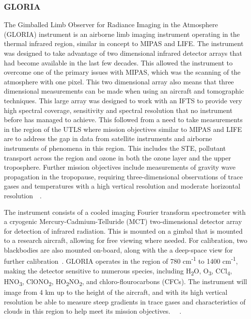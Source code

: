\subsubsection{GLORIA}
The Gimballed Limb Observer for Radiance Imaging in the Atmosphere (GLORIA) instrument is an airborne limb imaging instrument operating in the thermal infrared region, similar in concept to MIPAS and LIFE. The instrument was designed to take advantage of two dimensional infrared detector arrays that had become available in the last few decades. This allowed the instrument to overcome one of the primary issues with MIPAS, which was the scanning of the atmosphere with one pixel. This two dimensional array also means that three dimensional measurements can be made when using an aircraft and tomographic techniques. This large array was designed to work with an IFTS to provide very high spectral coverage, sensitivity and spectral resolution that no instrument before has managed to achieve. This followed from a need to take measurements in the region of the UTLS where mission objectives similar to MIPAS and LIFE are to address the gap in data from satellite instruments and airborne instruments of phenomena in this region. This includes the STE, pollutant transport across the region and ozone in both the ozone layer and the upper troposphere. Further mission objectives include measurements of gravity wave propagation in the tropopause, requiring three-dimensional observations of trace gases and temperatures with a high vertical resolution and moderate horizontal resolution~\citep{GLORIA_concept}~\citep{GLORIA_objectives}. 

The instrument consists of a cooled imaging Fourier transform spectrometer with a cryogenic Mercury-Cadmium-Telluride (MCT) two-dimensional detector array for detection of infrared radiation. This is mounted on a gimbal that is mounted to a research aircraft, allowing for free viewing where needed. For calibration, two blackbodies are also mounted on-board, along with the a deep-space view for further calibration~\citep{GLORIA_concept}. GLORIA operates in the region of  780 cm\textsuperscript{-1} to 1400 cm\textsuperscript{-1}, making the detector sensitive to numerous species, including H\textsubscript{2}O, O\textsubscript{3}, CCl\textsubscript{4}, HNO\textsubscript{3}, ClONO\textsubscript{2}, HO\textsubscript{2}NO\textsubscript{2}, and chloro-flourocarbons (CFCs). The instrument will image from 4 km up to the height of the aircraft, and with its high vertical resolution be able to measure steep gradients in trace gases and characteristics of clouds in this region to help meet its mission objectives. ~\citep{GLORIA_PhD}~\citep{GLORIA_objectives}.

